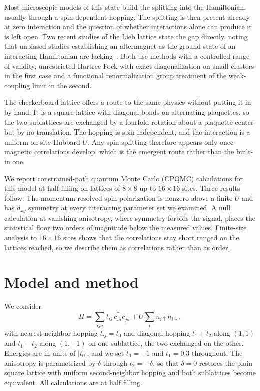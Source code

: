 \documentclass[aps,prb,reprint,superscriptaddress,amsmath,amssymb,floatfix]{revtex4-2}
\begin{document}
Most microscopic models of this state build the splitting into the Hamiltonian,
usually through a spin-dependent hopping. The splitting is then present already
at zero interaction and the question of whether interactions alone can produce
it is left open. Two recent studies of the Lieb lattice state the gap directly,
noting that unbiased studies establishing an altermagnet as the ground state of
an interacting Hamiltonian are lacking~\cite{Kaushal2025,Duerrnagel2025}. Both
use methods with a controlled range of validity, unrestricted Hartree-Fock with
exact diagonalization on small clusters in the first case and a functional
renormalization group treatment of the weak-coupling limit in the second.

The checkerboard lattice offers a route to the same physics without putting it
in by hand. It is a square lattice with diagonal bonds on alternating
plaquettes, so the two sublattices are exchanged by a fourfold rotation about a
plaquette center but by no translation. The hopping is spin independent, and
the interaction is a uniform on-site Hubbard $U$. Any spin splitting therefore
appears only once magnetic correlations develop, which is the emergent route
rather than the built-in one.

We report constrained-path quantum Monte Carlo (CPQMC) calculations for this
model at half filling on lattices of $8\times8$ up to $16\times16$ sites. Three
results follow. The momentum-resolved spin polarization is nonzero above a
finite $U$ and has $d_{xy}$ symmetry at every interacting parameter set we
examined. A null calculation at vanishing anisotropy, where symmetry forbids the
signal, places the statistical floor two orders of magnitude below the measured
values. Finite-size analysis to $16\times16$ sites shows that the correlations
stay short ranged on the lattices reached, so we describe them as correlations
rather than as order.


\section{Model and method}

We consider
\begin{equation}
H = \sum_{ij\sigma} t_{ij}\, c^{\dagger}_{i\sigma} c^{\phantom{\dagger}}_{j\sigma}
    + U \sum_i n_{i\uparrow} n_{i\downarrow},
\label{eq:H}
\end{equation}
with nearest-neighbor hopping $t_{ij} = t_0$ and diagonal hopping
$t_1 + t_2$ along $(1,1)$ and $t_1 - t_2$ along $(1,-1)$ on one sublattice, the
two exchanged on the other. Energies are in units of $|t_0|$, and we set
$t_0 = -1$ and $t_1 = 0.3$ throughout. The anisotropy is parametrized by
$\delta$ through $t_2 = -\delta$, so that $\delta = 0$ restores the plain square
lattice with uniform second-neighbor hopping and both sublattices become
equivalent. All calculations are at half filling.
\end{document}
